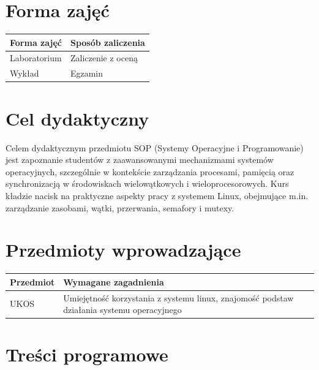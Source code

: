 \documentclass[12pt, a4paper]{article}
\begin{document}
\section{Forma zajęć}

\begin{tabular}{ll}
  \hline
  \textbf{Forma zajęć} & \textbf{Sposób zaliczenia} \\
  \hline
  Laboratorium & Zaliczenie z oceną \\
  Wykład & Egzamin \\
  \hline
\end{tabular}

\section{Cel dydaktyczny}

Celem dydaktycznym przedmiotu SOP (Systemy Operacyjne i Programowanie) jest zapoznanie studentów z zaawansowanymi mechanizmami systemów operacyjnych, szczególnie w kontekście zarządzania procesami, pamięcią oraz synchronizacją w środowiskach wielowątkowych i wieloprocesorowych. Kurs kładzie nacisk na praktyczne aspekty pracy z systemem Linux, obejmujące m.in. zarządzanie zasobami, wątki, przerwania, semafory i mutexy.

\section{Przedmioty wprowadzające}

\begin{tabularx}{\textwidth}{lX}
  \hline
  \textbf{Przedmiot} & \textbf{Wymagane zagadnienia} \\
  \hline
  UKOS & Umiejętność korzystania z systemu linux, znajomość podstaw działania systemu operacyjnego \\
  \hline
\end{tabularx}

\section{Treści programowe}
\end{document}
